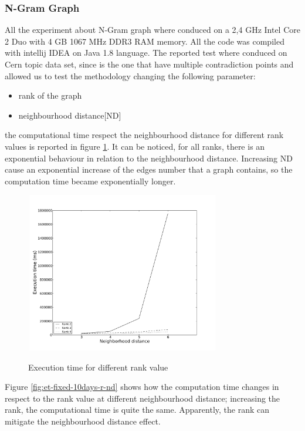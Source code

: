 \subsubsection*{N-Gram Graph }
All the experiment about N-Gram graph where conduced on a 2,4 GHz Intel Core 2 Duo with 4 GB 1067 MHz DDR3 RAM memory.
 All the code was compiled with intellij IDEA on Java 1.8 language. 
The reported test where conduced on Cern topic data set, since is the one that have multiple contradiction points and allowed us to test the methodology changing the following parameter:
\begin{itemize}
	\item rank of the graph
	\item neighbourhood distance[ND]
\end{itemize}


the computational time respect the neighbourhood distance for different rank values is reported in figure \ref{fig:et-fixed-10days-r-rank}.
It can be noticed, for all ranks, there is an exponential behaviour in relation to the neighbourhood distance. 
Increasing ND cause an exponential increase of the edges number that a graph contains, so the computation time became exponentially longer.

\begin{figure}[htbp]
	\centering
			{\includegraphics[width=8.5cm,height=7cm]{image/win_2_ranks.pdf}}	
		\caption[et-fixed-10days-r-rank]{Execution time for different rank value}
	\label{fig:et-fixed-10days-r-rank}
\end{figure} 

Figure \ref{fig:et-fixed-10days-r-nd} shows how the computation time changes in respect to the rank value at different neighbourhood distance;
increasing the rank, the computational time is quite the same.
Apparently, the rank can mitigate the neighbourhood distance effect.

